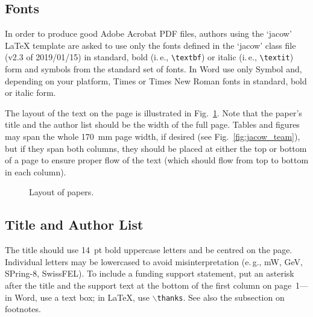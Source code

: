 \documentclass[a4paper,
               keeplastbox,   %
               ]{jacow}
\begin{document}
\subsection{Fonts}

In order to produce good Adobe Acrobat PDF files, authors
using the `jacow' \LaTeX{} template are asked to use only the fonts
defined in the ‘jacow’ class file (v2.3 of 2019/01/15) in standard, 
bold (i.\,e., \verb|\textbf|) or italic (i.\,e., \verb|\textit|) form and
symbols from the standard set of fonts. In Word use only
Symbol and, depending on your platform, Times or Times New Roman
fonts in standard, bold or italic form.

The layout of the text on the page is illustrated in
Fig.~\ref{fig:paper_layout}. Note that the paper’s title and the author list should
be the width of the full page. Tables and figures may span
the whole \SI{170}{mm} page width, if desired (see Fig.~\ref{fig:jacow_team}), but
if they span both columns, they should be placed at either
the top or bottom of a page to ensure proper flow of the
text (which should flow from top to bottom in each column).

\begin{figure}[!htb]
   \centering
   \caption{Layout of papers.}
   \label{fig:paper_layout}
\end{figure}

\begin{figure*}[!tbh]
    \centering

    \caption{Example of a full-width figure showing the JACoW Team at their annual
    	     meeting in December 2018. This figure has a multi-line caption that has to be
    	     justified rather than centred.}
    \label{fig:jacow_team}
\end{figure*}

\subsection{Title and Author List}

The title should use \SI{14}{pt} bold uppercase letters and be centred on the page.
Individual letters may be lowercased to avoid misinterpretation (e.\,g., mW, GeV, 
SPring-8, SwissFEL).
To include a funding support statement, put an asterisk after the title and
the support text at the bottom of the first column on page~1---in Word,
use a text box; in \LaTeX, use $\backslash$\texttt{thanks}. See also the
subsection on footnotes.
\end{document}
